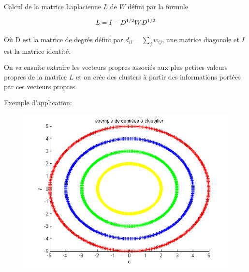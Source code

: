 \documentclass{beamer}
\begin{document}
\begin{frame}

Calcul de la matrice Laplacienne $L$ de $W$ défini par la formule 


\begin{equation}
\centering
L = I - D^{1/2} W D^{1/2}
\end{equation}

Où D est la matrice de degrés défini par $d_{ii} = \sum_j w_{ij}$, une matrice diagonale et $I$ est la matrice identité.

\medskip

On va ensuite extraire les vecteurs propres associés aux plus petites valeurs propres de la matrice $L$ et on crée des clusters à partir des informations portées par ces vecteurs propres.

\end{frame}

\begin{frame}

Exemple d'application:

\begin{figure}
\centering
\includegraphics[scale=0.5,angle=0]{DataSet.png}
\label{fig:MA} 
\end{figure}

\end{frame}
\end{document}
